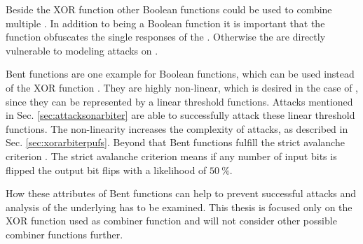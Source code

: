 Beside the \ac{XOR} function other Boolean functions could be used to combine multiple \apuf.
In addition to being a Boolean function it is important that the function obfuscates the single responses of the \apufs. Otherwise the \apufs are directly vulnerable to modeling attacks on \apufs.

Bent functions are one example for Boolean functions, which can be used instead of the \ac{XOR} function \cite{Adams1990Thedesign,Forre1990Thedefinition,Seberry1993Highlycriterion}.
They are highly non-linear, which is desired in the case of \apufs, since they can be represented by a linear threshold functions.
Attacks mentioned in Sec. \ref{sec:attacksonarbiter} are able to successfully attack these linear threshold functions.
The non-linearity increases the complexity of attacks, as described in Sec. \ref{sec:xorarbiterpufs}. %
Beyond that Bent functions fulfill the strict avalanche criterion \cite{Feistel1973Cryptographyprivacy}.
The strict avalanche criterion means if any number of input bits is flipped the output bit flips with a likelihood of $50\ \%$.

How these attributes of Bent functions can help to prevent successful attacks and analysis of the underlying \apufs has to be examined.
This thesis is focused only on the \ac{XOR} function used as combiner function and will not consider other possible combiner functions further.

